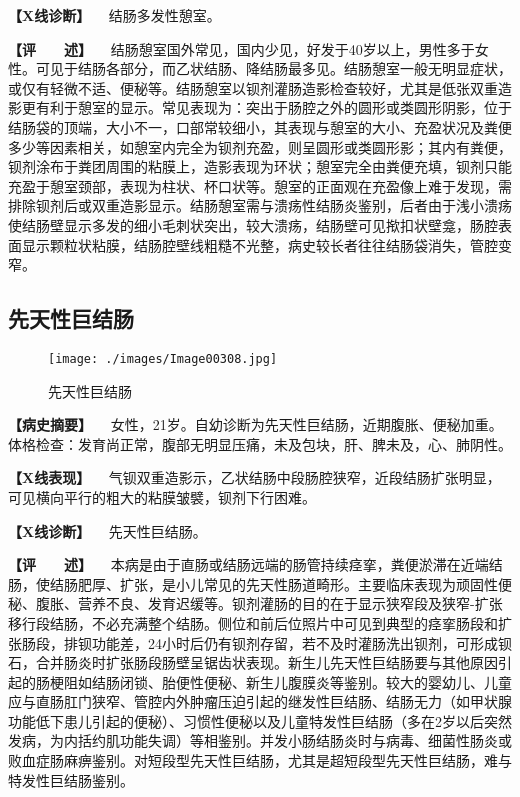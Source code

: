 \textbf{【X线诊断】} 　结肠多发性憩室。

\textbf{【评　　述】}
　结肠憩室国外常见，国内少见，好发于40岁以上，男性多于女性。可见于结肠各部分，而乙状结肠、降结肠最多见。结肠憩室一般无明显症状，或仅有轻微不适、便秘等。结肠憩室以钡剂灌肠造影检查较好，尤其是低张双重造影更有利于憩室的显示。常见表现为：突出于肠腔之外的圆形或类圆形阴影，位于结肠袋的顶端，大小不一，口部常较细小，其表现与憩室的大小、充盈状况及粪便多少等因素相关，如憩室内完全为钡剂充盈，则呈圆形或类圆形影；其内有粪便，钡剂涂布于粪团周围的粘膜上，造影表现为环状；憩室完全由粪便充填，钡剂只能充盈于憩室颈部，表现为柱状、杯口状等。憩室的正面观在充盈像上难于发现，需排除钡剂后或双重造影显示。结肠憩室需与溃疡性结肠炎鉴别，后者由于浅小溃疡使结肠壁显示多发的细小毛刺状突出，较大溃疡，结肠壁可见揿扣状壁龛，肠腔表面显示颗粒状粘膜，结肠腔壁线粗糙不光整，病史较长者往往结肠袋消失，管腔变窄。

\subsection{先天性巨结肠}

\begin{figure}[!htbp]
 \centering
 \texttt{[image: ./images/Image00308.jpg]}
 \captionsetup{justification=centering}
 \caption{先天性巨结肠}
 \label{fig5-6-2}
  \end{figure} 

\textbf{【病史摘要】}
　女性，21岁。自幼诊断为先天性巨结肠，近期腹胀、便秘加重。体格检查：发育尚正常，腹部无明显压痛，未及包块，肝、脾未及，心、肺阴性。

\textbf{【X线表现】}
　气钡双重造影示，乙状结肠中段肠腔狭窄，近段结肠扩张明显，可见横向平行的粗大的粘膜皱襞，钡剂下行困难。

\textbf{【X线诊断】} 　先天性巨结肠。

\textbf{【评　　述】}
　本病是由于直肠或结肠远端的肠管持续痉挛，粪便淤滞在近端结肠，使结肠肥厚、扩张，是小儿常见的先天性肠道畸形。主要临床表现为顽固性便秘、腹胀、营养不良、发育迟缓等。钡剂灌肠的目的在于显示狭窄段及狭窄-扩张移行段结肠，不必充满整个结肠。侧位和前后位照片中可见到典型的痉挛肠段和扩张肠段，排钡功能差，24小时后仍有钡剂存留，若不及时灌肠洗出钡剂，可形成钡石，合并肠炎时扩张肠段肠壁呈锯齿状表现。新生儿先天性巨结肠要与其他原因引起的肠梗阻如结肠闭锁、胎便性便秘、新生儿腹膜炎等鉴别。较大的婴幼儿、儿童应与直肠肛门狭窄、管腔内外肿瘤压迫引起的继发性巨结肠、结肠无力（如甲状腺功能低下患儿引起的便秘）、习惯性便秘以及儿童特发性巨结肠（多在2岁以后突然发病，为内括约肌功能失调）等相鉴别。并发小肠结肠炎时与病毒、细菌性肠炎或败血症肠麻痹鉴别。对短段型先天性巨结肠，尤其是超短段型先天性巨结肠，难与特发性巨结肠鉴别。

